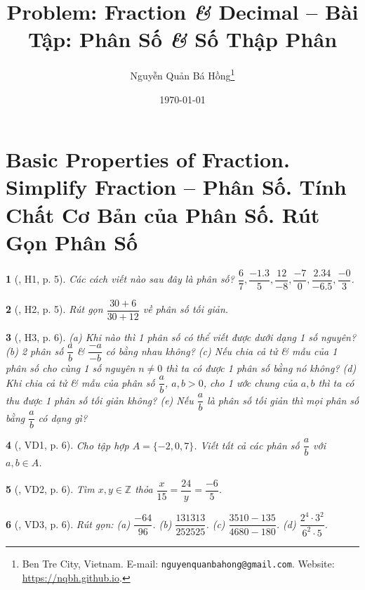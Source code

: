 \documentclass{article}
\title{Problem: Fraction {\it\&} Decimal -- Bài Tập: Phân Số {\it\&} Số Thập Phân}
\author{Nguyễn Quản Bá Hồng\footnote{Ben Tre City, Vietnam. E-mail: \texttt{nguyenquanbahong@gmail.com}. Website: \url{https://nqbh.github.io}.}}
\date{\today}
\newtheorem{baitoan}{}
\begin{document}
\maketitle
\tableofcontents


\section{Basic Properties of Fraction. Simplify Fraction -- Phân Số. Tính Chất Cơ Bản của Phân Số. Rút Gọn Phân Số}

\begin{baitoan}[\cite{Binh_boi_duong_Toan_6_tap_2}, H1, p. 5]
	Các cách viết nào sau đây là phân số? $\dfrac{6}{7},\dfrac{-1.3}{5},\dfrac{12}{-8},\dfrac{-7}{0},\dfrac{2.34}{-6.5},\dfrac{-0}{3}$.
\end{baitoan}

\begin{baitoan}[\cite{Binh_boi_duong_Toan_6_tap_2}, H2, p. 5]
	Rút gọn $\dfrac{30 + 6}{30 + 12}$ về phân số tối giản.
\end{baitoan}

\begin{baitoan}[\cite{Binh_boi_duong_Toan_6_tap_2}, H3, p. 6]
	(a) Khi nào thì 1 phân số có thể viết được dưới dạng 1 số nguyên? (b) 2 phân số $\dfrac{a}{b}$ \& $\dfrac{-a}{-b}$ có bằng nhau không? (c) Nếu chia cả tử \& mẫu của 1 phân số cho cùng 1 số nguyên $n\ne0$ thì ta có được 1 phân số bằng nó không? (d) Khi chia cả tử \& mẫu của phân số $\dfrac{a}{b}$, $a,b > 0$, cho 1 ước chung của $a,b$ thì ta có thu được 1 phân số tối giản không? (e) Nếu $\dfrac{a}{b}$ là phân số tối giản thì mọi phân số bằng $\dfrac{a}{b}$ có dạng gì?
\end{baitoan}

\begin{baitoan}[\cite{Binh_boi_duong_Toan_6_tap_2}, VD1, p. 6]
	Cho tập hợp $A = \{-2,0,7\}$. Viết tất cả các phân số $\dfrac{a}{b}$ với $a,b\in A$.
\end{baitoan}

\begin{baitoan}[\cite{Binh_boi_duong_Toan_6_tap_2}, VD2, p. 6]
	Tìm $x,y\in\mathbb{Z}$ thỏa $\dfrac{x}{15} = \dfrac{24}{y} = \dfrac{-6}{5}$.
\end{baitoan}

\begin{baitoan}[\cite{Binh_boi_duong_Toan_6_tap_2}, VD3, p. 6]
	Rút gọn: (a) $\dfrac{-64}{96}$. (b) $\dfrac{131313}{252525}$. (c) $\dfrac{3510 - 135}{4680 - 180}$. (d) $\dfrac{2^4\cdot3^2}{6^2\cdot5}$.
\end{baitoan}
\end{document}
